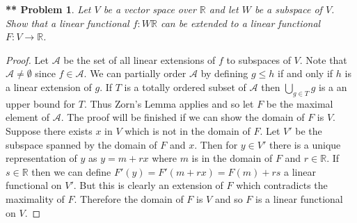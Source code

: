 \documentclass{article}
\newtheorem{**}{** Problem}
\begin{document}
\begin{flushleft}
\begin{**}
Let $V$ be a vector space over $\mathbb{R}$ and let $W$ be a subspace of $V$. Show that a linear functional $f : W \mathbb{R}$ can be extended to a linear functional $F : V \rightarrow \mathbb{R}$.
\end{**}
\begin{proof}
Let $\mathcal{A}$ be the set of all linear extensions of $f$ to subspaces of $V$. Note that $\mathcal{A} \neq \emptyset$ since $f \in \mathcal{A}$. We can partially order $\mathcal{A}$ by defining $g \leq h$ if and only if $h$ is a linear extension of $g$. If $T$ is a totally ordered subset of $\mathcal{A}$ then $\bigcup_{g \in T} g$ is a an upper bound for $T$. Thus Zorn's Lemma applies and so let $F$ be the maximal element of $\mathcal{A}$. The proof will be finished if we can show the domain of $F$ is $V$. Suppose there exists $x$ in $V$ which is not in the domain of $F$. Let $V'$ be the subspace spanned by the domain of $F$ and $x$. Then for $y \in V'$ there is a unique representation of $y$ as $y = m + r x$ where $m$ is in the domain of $F$ and $r \in \mathbb{R}$. If $s \in \mathbb{R}$ then we can define $F' (y) = F'(m + r x) = F(m) + r s$ a linear functional on $V'$. But this is clearly an extension of $F$ which contradicts the maximality of $F$. Therefore the domain of $F$ is $V$ and so $F$ is a linear functional on $V$.
\end{proof}

\end{flushleft}
\end{document}
